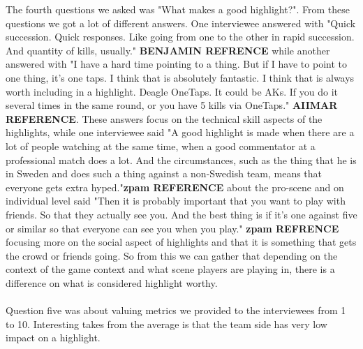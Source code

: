 The fourth questions we asked was "What makes a good highlight?". From these questions we got a lot of different answers. One interviewee answered with "Quick succession. Quick responses. Like going from one to the other in rapid succession. And quantity of kills, usually." \textbf{BENJAMIN REFRENCE} while another answered with "I have a hard time pointing to a thing. But if I have to point to one thing, it's one taps. I think that is absolutely fantastic. I think that is always worth including in a highlight. Deagle OneTaps. It could be AKs. If you do it several times in the same round, or you have 5 kills via OneTaps." \textbf{AIIMAR REFERENCE}. These answers focus on the technical skill aspects of the highlights, while one interviewee said "A good highlight is made when there are a lot of people watching at the same time, when a good commentator at a professional match does a lot. And the circumstances, such as the thing that he is in Sweden and does such a thing against a non-Swedish team, means that everyone gets extra hyped."\textbf{zpam REFERENCE} about the pro-scene and on individual level said "Then it is probably important that you want to play with friends. So that they actually see you. And the best thing is if it's one against five or similar so that everyone can see you when you play." \textbf{zpam REFRENCE} focusing more on the social aspect of highlights and that it is something that gets the crowd or friends going. So from this we can gather that depending on the context of the game context and what scene players are playing in, there is a difference on what is considered highlight worthy.\\\\
Question five was about valuing metrics we provided to the interviewees from 1 to 10. Interesting takes from the average is that the team side has very low impact on a highlight.\\\\
